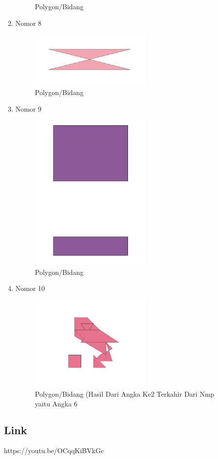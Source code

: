 \begin{enumerate}
\begin{figure}[H]
		\centering
		\caption{Polygon/Bidang}
	\end{figure}
	\item Nomor 8
	
	\begin{figure}[H]
		\includegraphics[width=6cm]{figures/Tugas2/1174062/Soal8.png}
		\centering
		\caption{Polygon/Bidang}
	\end{figure}
	\item Nomor 9
	
	\begin{figure}[H]
		\includegraphics[width=6cm]{figures/Tugas2/1174062/Soal9.png}
		\centering
		\caption{Polygon/Bidang}
	\end{figure}
	\item Nomor 10
	
	\begin{figure}[H]
		\includegraphics[width=6cm]{figures/Tugas2/1174062/Soal10.png}
		\centering
		\caption{Polygon/Bidang (Hasil Dari Angka Ke2 Terkahir Dari Nmp yaitu Angka 6}
	\end{figure}
\end{enumerate}
\subsection{Link}
https://youtu.be/OCqqKiBVkGc